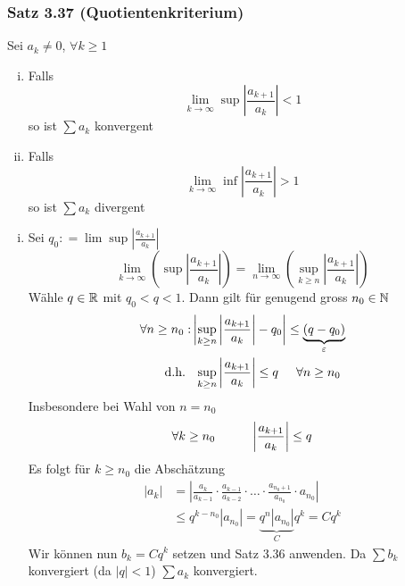 \subsubsection*{Satz 3.37 (Quotientenkriterium)}
Sei $a_k\not=0$, $\forall k\geq 1$ 

\begin{enumerate}[(i)]
\item Falls \[\mathop {\lim }\limits_{k \to \infty } \sup \left| {\frac{{{a_{k + 1}}}}{{{a_k}}}} \right| < 1\] so ist $\sum a_k$ konvergent
\item Falls \[\mathop {\lim }\limits_{k \to \infty } \inf \left| {\frac{{{a_{k + 1}}}}{{{a_k}}}} \right| > 1\] so ist $\sum a_k$ divergent
\end{enumerate}

\begin{beweis}{}
\begin{enumerate}[(i)]
\item Sei ${q_0}: = \lim \sup \left| {\frac{{{a_{k + 1}}}}{{{a_k}}}} \right|$ \[\mathop {\lim }\limits_{k \to \infty } \left( {\sup \left| {\frac{{{a_{k + 1}}}}{{{a_k}}}} \right|} \right) = \mathop {\lim }\limits_{n \to \infty } \left( {\mathop {\sup }\limits_{k \ge n} \left| {\frac{{{a_{k + 1}}}}{{{a_k}}}} \right|} \right)\] 
Wähle $q\in\mathbb{R}$ mit $q_0<q<1$. Dann gilt für genugend gross $n_0\in\mathbb{N}$ 
\begin{align*}
\forall n \ge {n_0}:&\left| {\mathop {\sup }\limits_{k \ge n} \left| {\frac{{{a_{k + 1}}}}{{{a_k}}}} \right| - {q_0}} \right| \le \underbrace {\left( {q - {q_0}} \right)}_\varepsilon\\
{\text{d.h. }}&\text{ }\mathop {\sup }\limits_{k \ge n} \left| {\frac{{{a_{k + 1}}}}{{{a_k}}}} \right| \le q\hspace{5mm}\forall n \ge {n_0}
\end{align*}
Insbesondere bei Wahl von $n=n_0$ 
\[\forall k \ge {n_0}\hspace{10mm}\left| {\frac{{{a_{k + 1}}}}{{{a_k}}}} \right| \le q\]
Es folgt für $k\geq n_0$ die Abschätzung
\begin{align*}
\left| {{a_k}} \right|&= \left| {\frac{{{a_k}}}{{{a_{k - 1}}}} \cdot \frac{{{a_{k - 1}}}}{{{a_{k - 2}}}} \cdot  \ldots  \cdot \frac{{{a_{{n_0} + 1}}}}{{{a_{{n_0}}}}} \cdot {a_{{n_0}}}} \right|\\
&\le {q^{k - {n_0}}}\left| {{a_{{n_0}}}} \right| = \underbrace {{q^n}\left| {{a_{{n_0}}}} \right|}_C{q^k} = C{q^k}
\end{align*}
Wir können nun $b_k=Cq^k$ setzen und Satz 3.36  anwenden. Da $\sum b_k$ konvergiert (da $\left| q\right| < 1$) $\sum a_k$ konvergiert.

\end{enumerate}
\end{beweis}
